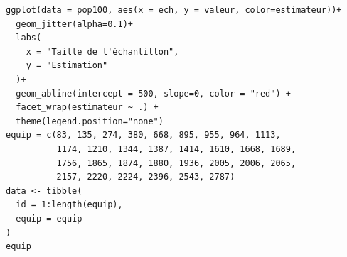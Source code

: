 \documentclass[10pt]{article}
\begin{document}
\begin{verbatim}
ggplot(data = pop100, aes(x = ech, y = valeur, color=estimateur))+
  geom_jitter(alpha=0.1)+
  labs(
    x = "Taille de l'échantillon",
    y = "Estimation"
  )+
  geom_abline(intercept = 500, slope=0, color = "red") +
  facet_wrap(estimateur ~ .) +
  theme(legend.position="none")
equip = c(83, 135, 274, 380, 668, 895, 955, 964, 1113, 
          1174, 1210, 1344, 1387, 1414, 1610, 1668, 1689, 
          1756, 1865, 1874, 1880, 1936, 2005, 2006, 2065, 
          2157, 2220, 2224, 2396, 2543, 2787)
data <- tibble(
  id = 1:length(equip),
  equip = equip
)
equip
\end{verbatim}


\end{document}
